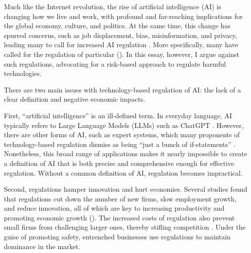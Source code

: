 

Much like the Internet revolution, the rise of artificial intelligence (AI) is changing how we live and work, with profound and far-reaching implications for the global economy, culture, and politics. At the same time, this change has spurred concerns, such as job displacement, bias, misinformation, and privacy, leading many to call for increased AI regulation \autocite{Meltzer2023USShouldRegulateAI}. More specifically, many have called for the regulation of particular (\cites{Biden2023EOAI}{AUDA-NEPAD2023WhitePaperAI}). In this essay, however, I argue against such regulations, advocating for a risk-based approach to regulate harmful technologies.

There are two main issues with technology-based regulation of AI: the lack of a clear definition and negative economic impacts.

First, “artificial intelligence” is an ill-defined term. In everyday language, AI typically refers to Large Language Models (LLMs) such as ChatGPT \autocite[p.\ 2]{Henman2020ImprovingPublicServicesAI}. However, there are other forms of AI, such as expert systems, which many proponents of technology-based regulation dismiss as being “just a bunch of if-statements” \autocite[p.\ 4]{Braun2024WhyAINotRegulated}. Nonetheless, this broad range of applications makes it nearly impossible to create a definition of AI that is both precise and comprehensive enough for effective regulation. Without a common definition of AI, regulation becomes impractical.

Second, regulations hamper innovation and hurt economies. Several studies found that regulations cut down the number of new firms, slow employment growth, and reduce innovation, all of which are key to increasing productivity and promoting economic growth (\cites[pp.\ 7--11]{BaileyThomas2017RegulatingAwayCompetition}[p.\ 45]{AghionEtAl2023RegulationInnovation}). The increased costs of regulation also prevent small firms from challenging larger ones, thereby stifling competition \autocite{Carney2012RegulationsProtectEntrenched}. Under the guise of promoting safety, entrenched businesses use regulations to maintain dominance in the market.

